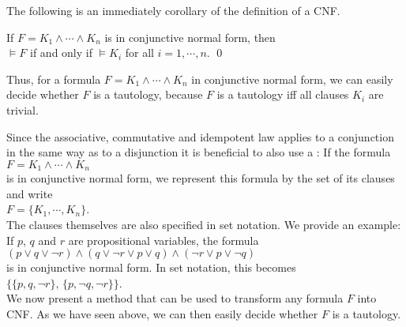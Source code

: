 \noindent
The following is an immediately corollary of the definition of a CNF.
\begin{Corollary} \label{corollary:knf}
  If $F = K_1 \wedge \cdots \wedge K_n$ is in conjunctive normal form, then\\[0.2cm]
  \hspace*{1.3cm} $\models F$ \quad if and only if \quad $\models K_i$ \quad for all $i=1,\cdots,n$. \qed
\end{Corollary}

Thus, for a formula $F = K_1 \wedge \cdots \wedge K_n$ in conjunctive normal form, we can easily decide whether
$F$ is a tautology, because $F$ is a tautology iff all clauses $K_i$ are trivial.
\vspace*{0.2cm}

Since the associative, commutative and idempotent law applies to a conjunction in the same way as to a
disjunction it is beneficial to also use a
:  If the formula
\\[0.2cm]
\hspace*{1.3cm}
$F = K_1 \wedge \cdots \wedge K_n$
\\[0.2cm]
is in conjunctive normal form, we represent this formula
by the set of its clauses and write \\[0.2cm]
\hspace*{1.3cm} 
$F = \{ K_1, \cdots, K_n \}$. 
\\[0.2cm]
The clauses themselves are also specified in set notation.
We provide an example: If $p$, $q$ and $r$ are propositional variables, the formula 
\\[0.2cm]
\hspace*{1.3cm}
$(p \vee q \vee \neg r) \wedge (q \vee \neg r \vee p \vee q)\wedge (\neg r \vee p \vee \neg q)$
\\[0.2cm]
is in conjunctive normal form.  In set notation, this becomes
\\[0.2cm]
\hspace*{1.3cm}
$\bigl\{ \{p, q, \neg r \},\, \{ p, \neg q, \neg r \} \bigr\}$.
\\[0.2cm]
We now present a method that can be used to transform any formula $F$ into CNF.  As we have seen above, we can
then easily decide whether $F$ is a tautology. 
